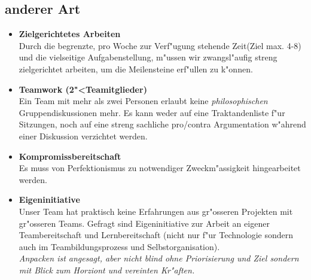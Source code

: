 \subsection{anderer Art}
\begin{itemize}{}{}
\item \textbf{{Zielgerichtetes Arbeiten}} \\
Durch die begrenzte, pro Woche zur Verf"ugung stehende Zeit(Ziel max. 4-8) und die vielseitige
 Aufgabenstellung, m"ussen wir zwangsl"aufig streng zielgerichtet arbeiten, um die Meilensteine
 erf"ullen zu k"onnen.

\item \textbf{{Teamwork (2"<Teamitglieder)}} \\
Ein Team mit mehr als zwei Personen erlaubt keine \textit{philosophischen}  Gruppendiskussionen mehr.
Es kann weder auf eine Traktandenliste f"ur Sitzungen, noch auf eine streng sachliche pro/contra
Argumentation w"ahrend einer Diskussion verzichtet werden.

\item \textbf{{Kompromissbereitschaft}} \\
Es muss von Perfektionismus zu notwendiger Zweckm"assigkeit hingearbeitet werden.

\item \textbf{{Eigeninitiative}} \\
Unser Team hat praktisch keine Erfahrungen aus gr"osseren Projekten mit gr"osseren Teams.
Gefragt sind Eigeninitiative zur Arbeit an eigener Teambereitschaft und Lernbereitschaft (nicht
nur f"ur Technologie sondern auch im Teambildungsprozess und Selbstorganisation).
\\
\textit{Anpacken ist angesagt, aber nicht blind ohne Priorisierung und Ziel sondern
        mit Blick zum Horziont und vereinten Kr"aften.
        }
\end{itemize}
